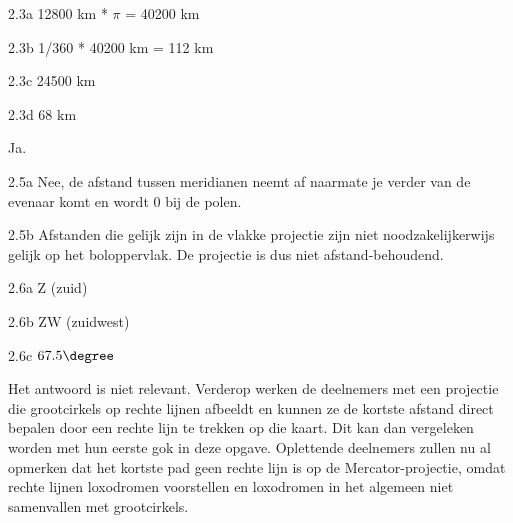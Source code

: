 \begin{Antwoord}{2.3a}
			12800 km * $\pi$ = 40200 km
		
\end{Antwoord}
\begin{Antwoord}{2.3b}
			1/360 * 40200 km = 112 km
		
\end{Antwoord}
\begin{Antwoord}{2.3c}
			24500 km
		
\end{Antwoord}
\begin{Antwoord}{2.3d}
			68 km
		
\end{Antwoord}
\begin{Antwoord}{2.4}
		Ja.
	
\end{Antwoord}
\begin{Antwoord}{2.5a}
			Nee, de afstand tussen meridianen neemt af naarmate je verder van de evenaar komt en wordt 0 bij de polen.
		
\end{Antwoord}
\begin{Antwoord}{2.5b}
			Afstanden die gelijk zijn in de vlakke projectie zijn niet noodzakelijkerwijs gelijk op het boloppervlak. De projectie is dus niet afstand-behoudend.
		
\end{Antwoord}
\begin{Antwoord}{2.6a}
			Z (zuid)
		
\end{Antwoord}
\begin{Antwoord}{2.6b}
			ZW (zuidwest)
		
\end{Antwoord}
\begin{Antwoord}{2.6c}
			$67.5\degree$
		
\end{Antwoord}
\begin{Antwoord}{2.13}
		Het antwoord is niet relevant. Verderop werken de deelnemers met een projectie die grootcirkels op rechte lijnen afbeeldt en kunnen ze de kortste afstand direct bepalen door een rechte lijn te trekken op die kaart. Dit kan dan vergeleken worden met hun eerste gok in deze opgave. Oplettende deelnemers zullen nu al opmerken dat het kortste pad geen rechte lijn is op de Mercator-projectie, omdat rechte lijnen loxodromen voorstellen en loxodromen in het algemeen niet samenvallen met grootcirkels.
	
\end{Antwoord}
